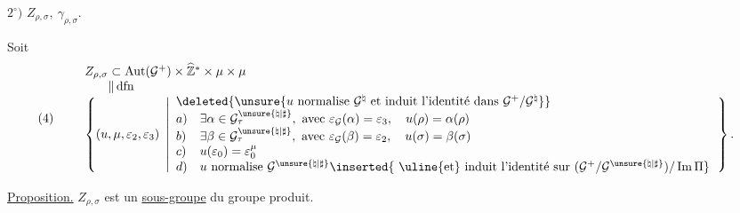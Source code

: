 

$2^\circ)$ \quad $Z_{\rho,\sigma},\ \gamma_{\rho,\sigma}$.

Soit
\[
(4)\qquad
\begin{array}{l}
 Z_{\rho,\sigma}\subset
 \operatorname{Aut}(\mathcal{G}^{+})\times
 \widehat{\mathbb{Z}}^{*}\times\mu\times\mu\\
 \phantom{Z_{\rho,\sigma}}\Vert\,\mathrm{dfn}\\
 \left\{(u,\mu,\varepsilon_2,\varepsilon_3)\ \left|
 \begin{array}{ll}
 \multicolumn{2}{l}{\deleted{\unsure{u\ \text{normalise}\ \mathcal{G}^{\natural}\ 
 \text{et induit l'identité dans}\ \mathcal{G}^{+}/\mathcal{G}^{\natural}}}}\\
 a)&\exists\alpha\in\mathcal{G}_{\tau}^{\unsure{\natural|\sharp}},
 \ \text{avec }\varepsilon_{\mathcal{G}}(\alpha)=\varepsilon_3,
 \quad u(\rho)=\alpha(\rho)\\
 b)&\exists\beta\in\mathcal{G}_{\tau}^{\unsure{\natural|\sharp}},
 \ \text{avec }\varepsilon_{\mathcal{G}}(\beta)=\varepsilon_2,
 \quad u(\sigma)=\beta(\sigma)\\
 c)&u(\varepsilon_0)=\varepsilon_0^\mu\\
 d)&u\ \text{normalise }\mathcal{G}^{\unsure{\natural|\sharp}}
 \inserted{\ \text{\uline{et} induit l'identité sur }
 (\mathcal{G}^{+}/\mathcal{G}^{\unsure{\natural|\sharp}})/\operatorname{Im}\Pi}
 \end{array}\right.\right\}.
\end{array}
\]

\uline{Proposition.} \quad $Z_{\rho,\sigma}$ est un \uline{sous-groupe}
du groupe produit.

